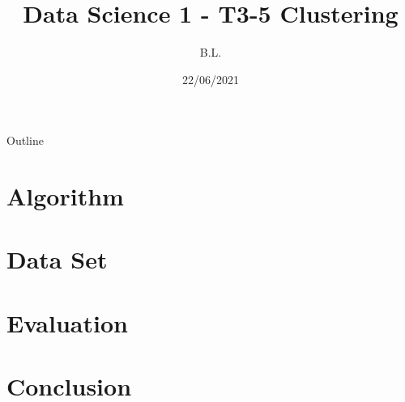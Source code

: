 \documentclass[aspectratio=43]{beamer}
\title[Data Science 1]{Data Science 1 - T3-5 Clustering}
\author{B.L.}
\institute{Goethe Universität Frankfurt}
\date{22/06/2021}
\begin{document}
\begin{frame}
  \titlepage
\end{frame}

\begin{frame}{Outline}
  \tableofcontents
\end{frame}

\section{Algorithm}
\label{sec:algo}


\section{Data Set}
\label{sec:data}


\section{Evaluation}
\label{sec:eval}


\section{Conclusion}
\label{sec:conclustion}

\end{document}
